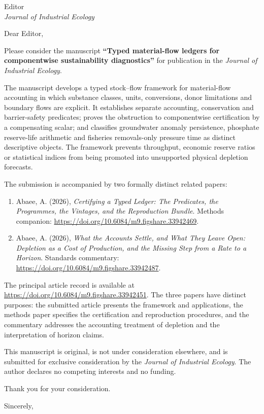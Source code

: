 \documentclass[11pt]{letter}
\date{19 September 2026}
\begin{document}
\begin{letter}{Editor\\\emph{Journal of Industrial Ecology}}
\opening{Dear Editor,}

Please consider the manuscript \textbf{``Typed material-flow ledgers for componentwise sustainability diagnostics''} for publication in the \emph{Journal of Industrial Ecology}.

The manuscript develops a typed stock--flow framework for material-flow accounting in which substance classes, units, conversions, donor limitations and boundary flows are explicit. It establishes separate accounting, conservation and barrier-safety predicates; proves the obstruction to componentwise certification by a compensating scalar; and classifies groundwater anomaly persistence, phosphate reserve-life arithmetic and fisheries removals-only pressure time as distinct descriptive objects. The framework prevents throughput, economic reserve ratios or statistical indices from being promoted into unsupported physical depletion forecasts.

The submission is accompanied by two formally distinct related papers:

\begin{enumerate}
\item Abaee, A. (2026), \emph{Certifying a Typed Ledger: The Predicates, the Programmes, the Vintages, and the Reproduction Bundle}. Methods companion: \url{https://doi.org/10.6084/m9.figshare.33942469}.
\item Abaee, A. (2026), \emph{What the Accounts Settle, and What They Leave Open: Depletion as a Cost of Production, and the Missing Step from a Rate to a Horizon}. Standards commentary: \url{https://doi.org/10.6084/m9.figshare.33942487}.
\end{enumerate}

The principal article record is available at \url{https://doi.org/10.6084/m9.figshare.33942451}. The three papers have distinct purposes: the submitted article presents the framework and applications, the methods paper specifies the certification and reproduction procedures, and the commentary addresses the accounting treatment of depletion and the interpretation of horizon claims.

This manuscript is original, is not under consideration elsewhere, and is submitted for exclusive consideration by the \emph{Journal of Industrial Ecology}. The author declares no competing interests and no funding.

Thank you for your consideration.

\closing{Sincerely,}
\end{letter}
\end{document}
